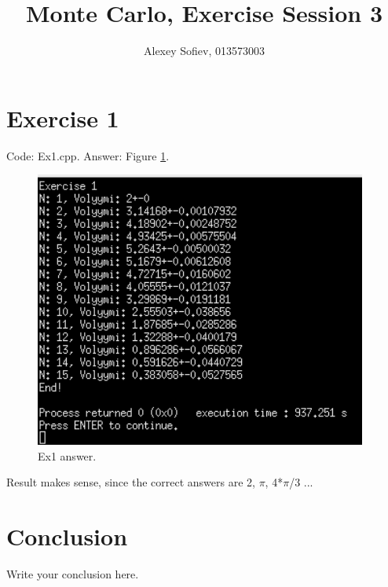 \documentclass{article}
\begin{document}
\title{Monte Carlo, Exercise Session 3}
\author{Alexey Sofiev, 013573003}

\maketitle


\section{Exercise 1}
Code: Ex1.cpp. Answer: Figure \ref{fig:ex1_answer}.

\begin{figure}[!hbt]
    \centering
    \includegraphics[width=4.3in]{ex1_answer}
    \caption{Ex1 answer.}
    \label{fig:ex1_answer}
\end{figure}

	Result makes sense, since the correct answers are 2, $\pi$, 4*$\pi$/3 ...


\section{Conclusion}
Write your conclusion here.
\end{document}
